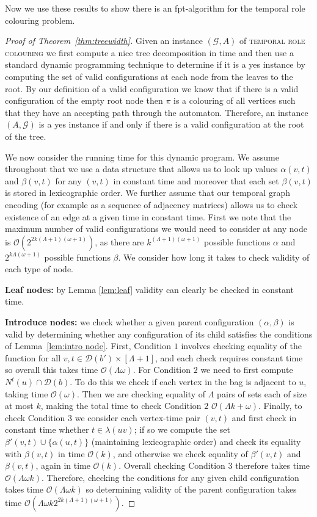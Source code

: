 \documentclass[runningheads]{llncs}
\begin{document}
Now we use these results to show there is an fpt-algorithm for the temporal role colouring problem.
\begin{proof}[Proof of Theorem~\ref{thm:treewidth}]
Given an instance $(\mathcal{G},A)$ of \textsc{temporal role colouring} we first compute a nice tree decomposition in time and then use a standard dynamic programming technique to determine if it is a yes instance by computing the set of valid configurations at each node from the leaves to the root. By our definition of a valid configuration we know that if there is a valid configuration of the empty root node then $\pi$ is a colouring of all vertices such that they have an accepting path through the automaton. Therefore, an instance $(A,\mathcal{G})$ is a yes instance if and only if there is a valid configuration at the root of the tree.

We now consider the running time for this dynamic program.
We assume throughout that we use a data structure that allows us to look up values $\alpha(v,t)$ and $\beta(v,t)$ for any $(v,t)$ in constant time and moreover that each set $\beta(v,t)$ is stored in lexicographic order.
We further assume that our temporal graph encoding (for example as a sequence of adjacency matrices) allows us to check existence of an edge at a given time in constant time.
First we note that the maximum number of valid configurations we would need to consider at any node is $\mathcal{O}(2^{2k(\Lambda+1)(\omega+1)})$, as there are $k^{(\Lambda+1)(\omega+1)}$ possible functions $\alpha$ and $2^{k\Lambda(\omega+1)}$ possible functions $\beta$. 
We consider how long it takes to check validity of each type of node.

\textbf{Leaf nodes:} by Lemma \ref{lem:leaf} validity can clearly be checked in constant time.

\textbf{Introduce nodes:} we check whether a given parent configuration $(\alpha,\beta)$ is valid by determining whether any configuration of its child satisfies the conditions of Lemma~\ref{lem:intro node}.
First, Condition $1$ involves checking equality of the function for all $v,t \in \mathcal{D}(b') \times [\Lambda+1]$, and each check requires constant time so overall this takes time $\mathcal{O}(\Lambda \omega)$.
For Condition $2$ we need to first compute $N^t(u) \cap \mathcal{D}(b)$.  To do this we check if each vertex in the bag is adjacent to $u$, taking time $\mathcal{O}(\omega)$.
Then we are checking equality of $\Lambda$ pairs of sets each of size at most $k$, making the total time to check Condition $2$ $\mathcal{O}(\Lambda k+ \omega)$.
Finally, to check Condition $3$ we consider each vertex-time pair $(v,t)$ and first check in constant time  whether $t \in \lambda(uv)$; if so we compute the set $\beta'(v,t) \cup \{\alpha(u,t)\}$ (maintaining lexicographic order) and check its equality with $\beta(v,t)$ in time $\mathcal{O}(k)$, and otherwise we check equality of $\beta'(v,t)$ and $\beta(v,t)$, again in time $\mathcal{O}(k)$. Overall checking Condition $3$ therefore takes time $\mathcal{O}(\Lambda \omega k)$.
Therefore, checking the conditions for any given child configuration takes time $\mathcal{O}(\Lambda\omega k)$ so determining validity of the parent configuration takes time $\mathcal{O}(\Lambda\omega k2^{2k(\Lambda+1)(\omega+1)})$.



\end{proof}
\end{document}
